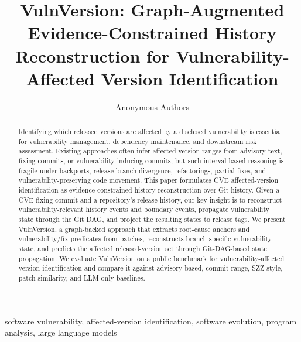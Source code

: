 \documentclass[10pt,conference]{IEEEtran}
\begin{document}
\title{VulnVersion: Graph-Augmented Evidence-Constrained History Reconstruction for Vulnerability-Affected Version Identification}

\author{Anonymous Authors}

\maketitle

\begin{abstract}
Identifying which released versions are affected by a disclosed vulnerability is essential for vulnerability management, dependency maintenance, and downstream risk assessment. Existing approaches often infer affected version ranges from advisory text, fixing commits, or vulnerability-inducing commits, but such interval-based reasoning is fragile under backports, release-branch divergence, refactorings, partial fixes, and vulnerability-preserving code movement. This paper formulates CVE affected-version identification as evidence-constrained history reconstruction over Git history. Given a CVE fixing commit and a repository's release history, our key insight is to reconstruct vulnerability-relevant history events and boundary events, propagate vulnerability state through the Git DAG, and project the resulting states to release tags. We present VulnVersion, a graph-backed approach that extracts root-cause anchors and vulnerability/fix predicates from patches, reconstructs branch-specific vulnerability state, and predicts the affected released-version set through Git-DAG-based state propagation. We evaluate VulnVersion on a public benchmark for vulnerability-affected version identification and compare it against advisory-based, commit-range, SZZ-style, patch-similarity, and LLM-only baselines.
\end{abstract}

\begin{IEEEkeywords}
software vulnerability, affected-version identification, software evolution, program analysis, large language models
\end{IEEEkeywords}














\end{document}
